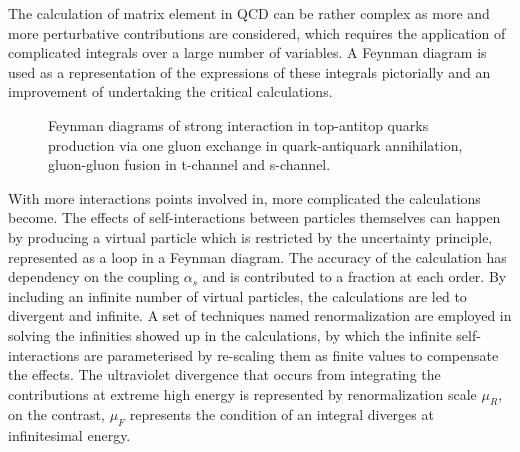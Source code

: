 \documentclass[UTF8,12pt]{ctexart}
\numberwithin{equation}{section}
\begin{document}
The calculation of matrix element in QCD can be rather complex as more and more perturbative contributions are considered, which requires the application of complicated integrals over a large number of variables. A Feynman diagram is used as a representation of the expressions of these integrals pictorially and an improvement of undertaking the critical calculations.

\begin{figure}[htb] 
	\centering  
 	\caption[]{Feynman diagrams of strong interaction in top-antitop quarks production via  one gluon exchange in quark-antiquark annihilation, gluon-gluon fusion in  t-channel and  s-channel.}
\end{figure}

With more interactions points involved in, more complicated the calculations become. The effects of self-interactions between particles themselves can happen by producing a virtual particle which is restricted by the uncertainty principle, represented as a loop in a Feynman diagram. The accuracy of the calculation has dependency on the coupling $\alpha_{s}$ and is contributed to a fraction at each order. By including an infinite number of virtual particles, the calculations are led to divergent and infinite.
A set of techniques named renormalization are employed in solving the infinities showed up in the calculations, by which the infinite self-interactions are parameterised by re-scaling them as finite values to compensate the effects. The ultraviolet divergence that occurs from integrating the contributions at extreme high energy is represented by renormalization scale $\mu_R$, on the contrast,  $\mu_F$ represents the condition of an integral diverges at infinitesimal energy.
\end{document}

